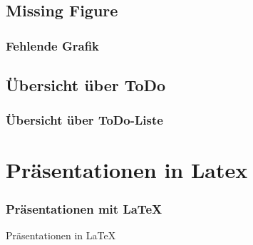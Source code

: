 \documentclass{beamer}
\begin{document}
\subsection{Missing Figure}
\begin{frame}[fragile]
\frametitle{Fehlende Grafik}
 \begin{semiverbatim}
 \end{semiverbatim}
\end{frame}

\subsection{Übersicht über ToDo}
\begin{frame}[fragile]
\frametitle{Übersicht über ToDo-Liste}
 \begin{semiverbatim}
 \end{semiverbatim}
\end{frame}


\section{Präsentationen in Latex}
\begin{frame}
\frametitle{Präsentationen mit \LaTeX}
 \begin{center}
	\Huge Präsentationen in \LaTeX
 \end{center}
\end{frame}
\end{document}
